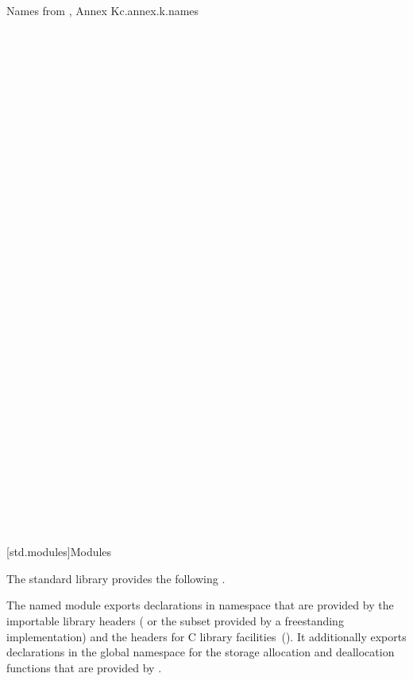 \begin{multicolfloattable}{Names from \IsoC{}, Annex K}{c.annex.k.names}
 \\
 \\
 \\
 \\
 \\
 \\
 \\
 \\
 \\
 \\
 \\
 \\
 \\
 \\
 \\
 \\
 \\
\columnbreak
{} \\
 \\
 \\
 \\
 \\
 \\
 \\
 \\
 \\
 \\
 \\
 \\
 \\
 \\
 \\
 \\
 \\
\end{multicolfloattable}

[std.modules]{Modules}

\pnum
The \Cpp{} standard library provides
the following .

\pnum
The named module  exports declarations in namespace 
that are provided by the importable \Cpp{} library headers
( or the subset provided by a freestanding implementation)
and the \Cpp{} headers for C library facilities~().
It additionally exports declarations in the global namespace
for the storage allocation and deallocation functions
that are provided by .

